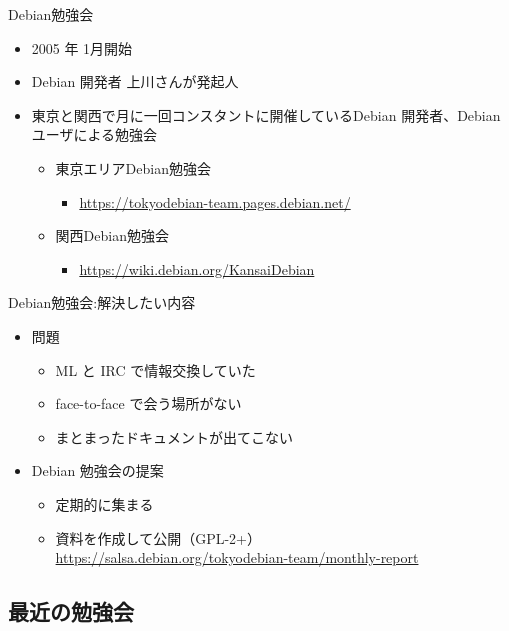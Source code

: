 \begin{frame}{Debian勉強会}

\begin{itemize}
 \item 2005 年 1月開始
 \item Debian 開発者 上川さんが発起人
 \item 東京と関西で月に一回コンスタントに開催しているDebian 開発者、Debian ユーザによる勉強会
   \begin{itemize}
   \item 東京エリアDebian勉強会
     \begin{itemize}
     \item \url{https://tokyodebian-team.pages.debian.net/}
     \end{itemize}
   \item 関西Debian勉強会
     \begin{itemize}
     \item \url{https://wiki.debian.org/KansaiDebian}
     \end{itemize}
   \end{itemize}
\end{itemize}

\end{frame}


\begin{frame}{Debian勉強会:解決したい内容}

\begin{itemize}
 \item 問題
   \begin{itemize}
   \item ML と IRC で情報交換していた
   \item face-to-face で会う場所がない
   \item まとまったドキュメントが出てこない
   \end{itemize}
 \item Debian 勉強会の提案
   \begin{itemize}
   \item 定期的に集まる
   \item 資料を作成して公開（GPL-2+） \\
	 {\small \url{https://salsa.debian.org/tokyodebian-team/monthly-report}}
   \end{itemize}
\end{itemize}

\end{frame}


\subsection{最近の勉強会}


